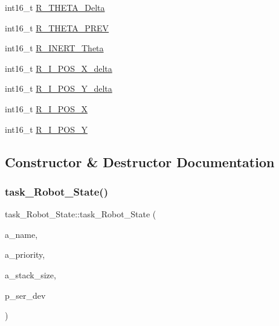 \begin{DoxyCompactItemize}
int16\+\_\+t \mbox{\hyperlink{classtask__Robot__State_a772428378cbfa80671052f337813d553}{R\+\_\+\+T\+H\+E\+T\+A\+\_\+\+Delta}}
\item 
int16\+\_\+t \mbox{\hyperlink{classtask__Robot__State_ad9d332e1ffb2e65e5a48d1057893622e}{R\+\_\+\+T\+H\+E\+T\+A\+\_\+\+P\+R\+EV}}
\item 
int16\+\_\+t \mbox{\hyperlink{classtask__Robot__State_a2a4a5d2abd4a14220046ac998a5cf69b}{R\+\_\+\+I\+N\+E\+R\+T\+\_\+\+Theta}}
\item 
int16\+\_\+t \mbox{\hyperlink{classtask__Robot__State_ab4655f5e8aaea75407b874f3bd996523}{R\+\_\+\+I\+\_\+\+P\+O\+S\+\_\+\+X\+\_\+delta}}
\item 
int16\+\_\+t \mbox{\hyperlink{classtask__Robot__State_ac9d2b68ee2d97d96dac1529603a29a64}{R\+\_\+\+I\+\_\+\+P\+O\+S\+\_\+\+Y\+\_\+delta}}
\item 
int16\+\_\+t \mbox{\hyperlink{classtask__Robot__State_a2779c14a58fecdd58d9c89ebfc2feab4}{R\+\_\+\+I\+\_\+\+P\+O\+S\+\_\+X}}
\item 
int16\+\_\+t \mbox{\hyperlink{classtask__Robot__State_aede857ebfddce9d20330103e3e5b72c0}{R\+\_\+\+I\+\_\+\+P\+O\+S\+\_\+Y}}
\end{DoxyCompactItemize}


\subsection{Constructor \& Destructor Documentation}
\mbox{\label{classtask__Robot__State_af64f9fb28ae6d78ce60bd20950aed12e}} 
\subsubsection{\texorpdfstring{task\_Robot\_State()}{task\_Robot\_State()}}
{\footnotesize\ttfamily task\+\_\+\+Robot\+\_\+\+State\+::task\+\_\+\+Robot\+\_\+\+State (\begin{DoxyParamCaption}\item[{const char $\ast$}]{a\+\_\+name,  }\item[{unsigned port\+B\+A\+S\+E\+\_\+\+T\+Y\+PE}]{a\+\_\+priority,  }\item[{size\+\_\+t}]{a\+\_\+stack\+\_\+size,  }\item[{emstream $\ast$}]{p\+\_\+ser\+\_\+dev }\end{DoxyParamCaption})}

